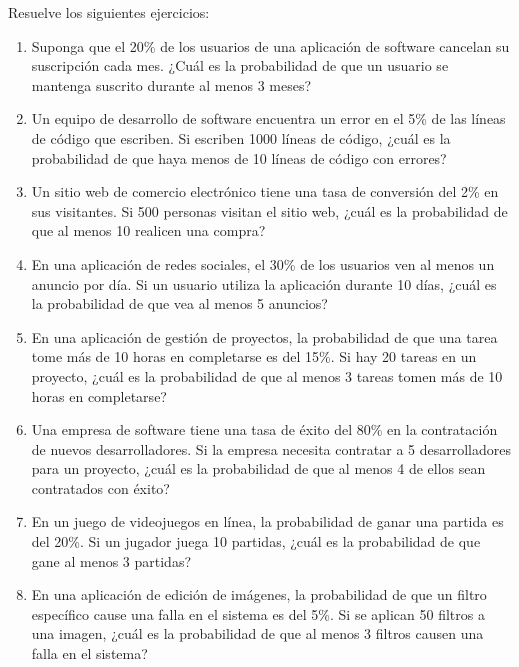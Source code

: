 \begin{Ejer}
Resuelve los siguientes ejercicios:
\begin{enumerate}

    \item Suponga que el 20\% de los usuarios de una aplicación de software cancelan su suscripción cada mes. ¿Cuál es la probabilidad de que un usuario se mantenga suscrito durante al menos 3 meses?

    \item Un equipo de desarrollo de software encuentra un error en el 5\% de las líneas de código que escriben. Si escriben 1000 líneas de código, ¿cuál es la probabilidad de que haya menos de 10 líneas de código con errores?

    \item Un sitio web de comercio electrónico tiene una tasa de conversión del 2\% en sus visitantes. Si 500 personas visitan el sitio web, ¿cuál es la probabilidad de que al menos 10 realicen una compra?

    \item En una aplicación de redes sociales, el 30\% de los usuarios ven al menos un anuncio por día. Si un usuario utiliza la aplicación durante 10 días, ¿cuál es la probabilidad de que vea al menos 5 anuncios?

    \item En una aplicación de gestión de proyectos, la probabilidad de que una tarea tome más de 10 horas en completarse es del 15\%. Si hay 20 tareas en un proyecto, ¿cuál es la probabilidad de que al menos 3 tareas tomen más de 10 horas en completarse?

    \item Una empresa de software tiene una tasa de éxito del 80\% en la contratación de nuevos desarrolladores. Si la empresa necesita contratar a 5 desarrolladores para un proyecto, ¿cuál es la probabilidad de que al menos 4 de ellos sean contratados con éxito?

    \item En un juego de videojuegos en línea, la probabilidad de ganar una partida es del 20\%. Si un jugador juega 10 partidas, ¿cuál es la probabilidad de que gane al menos 3 partidas?

    \item En una aplicación de edición de imágenes, la probabilidad de que un filtro específico cause una falla en el sistema es del 5\%. Si se aplican 50 filtros a una imagen, ¿cuál es la probabilidad de que al menos 3 filtros causen una falla en el sistema?


\end{enumerate}
\end{Ejer}
